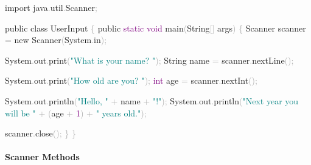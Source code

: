 \documentclass[
  justified,
  openright,
]{tufte-book}
\let\subsubsection\paragraph
\let\paragraph\paragraph
\newcommand{\BuiltInTok}[1]{#1}
\newcommand{\DataTypeTok}[1]{\textcolor{Purple}{#1}}
\newcommand{\DecValTok}[1]{\textcolor{Purple}{#1}}
\newcommand{\FunctionTok}[1]{\textcolor{BrandBlue}{#1}}
\newcommand{\ImportTok}[1]{\textcolor{BrandAccent}{#1}}
\newcommand{\KeywordTok}[1]{\textcolor{BrandBlue}{#1}}
\newcommand{\NormalTok}[1]{#1}
\newcommand{\OperatorTok}[1]{\textcolor{DarkGray}{#1}}
\newcommand{\StringTok}[1]{\textcolor{Teal}{#1}}
\newenvironment{Shaded}{%
  \begin{snugshade}
}{%
  \end{snugshade}
}
\let\subsubsection\paragraph
\let\paragraph\paragraph
\begin{document}
\begin{Shaded}
\begin{Highlighting}[]
\KeywordTok{import} \ImportTok{java}\OperatorTok{.}\ImportTok{util}\OperatorTok{.}\ImportTok{Scanner}\OperatorTok{;}

\KeywordTok{public} \KeywordTok{class}\NormalTok{ UserInput }\OperatorTok{\{}
    \KeywordTok{public} \DataTypeTok{static} \DataTypeTok{void} \FunctionTok{main}\OperatorTok{(}\BuiltInTok{String}\OperatorTok{[]}\NormalTok{ args}\OperatorTok{)} \OperatorTok{\{}
        \BuiltInTok{Scanner}\NormalTok{ scanner }\OperatorTok{=} \KeywordTok{new} \BuiltInTok{Scanner}\OperatorTok{(}\BuiltInTok{System}\OperatorTok{.}\FunctionTok{in}\OperatorTok{);}

        \BuiltInTok{System}\OperatorTok{.}\FunctionTok{out}\OperatorTok{.}\FunctionTok{print}\OperatorTok{(}\StringTok{"What is your name? "}\OperatorTok{);}
        \BuiltInTok{String}\NormalTok{ name }\OperatorTok{=}\NormalTok{ scanner}\OperatorTok{.}\FunctionTok{nextLine}\OperatorTok{();}

        \BuiltInTok{System}\OperatorTok{.}\FunctionTok{out}\OperatorTok{.}\FunctionTok{print}\OperatorTok{(}\StringTok{"How old are you? "}\OperatorTok{);}
        \DataTypeTok{int}\NormalTok{ age }\OperatorTok{=}\NormalTok{ scanner}\OperatorTok{.}\FunctionTok{nextInt}\OperatorTok{();}

        \BuiltInTok{System}\OperatorTok{.}\FunctionTok{out}\OperatorTok{.}\FunctionTok{println}\OperatorTok{(}\StringTok{"Hello, "} \OperatorTok{+}\NormalTok{ name }\OperatorTok{+} \StringTok{"!"}\OperatorTok{);}
        \BuiltInTok{System}\OperatorTok{.}\FunctionTok{out}\OperatorTok{.}\FunctionTok{println}\OperatorTok{(}\StringTok{"Next year you will be "} \OperatorTok{+} \OperatorTok{(}\NormalTok{age }\OperatorTok{+} \DecValTok{1}\OperatorTok{)} \OperatorTok{+} \StringTok{" years old."}\OperatorTok{);}

\NormalTok{        scanner}\OperatorTok{.}\FunctionTok{close}\OperatorTok{();}
    \OperatorTok{\}}
\OperatorTok{\}}
\end{Highlighting}
\end{Shaded}

\subsubsection{Scanner Methods}\label{scanner-methods}
\end{document}
